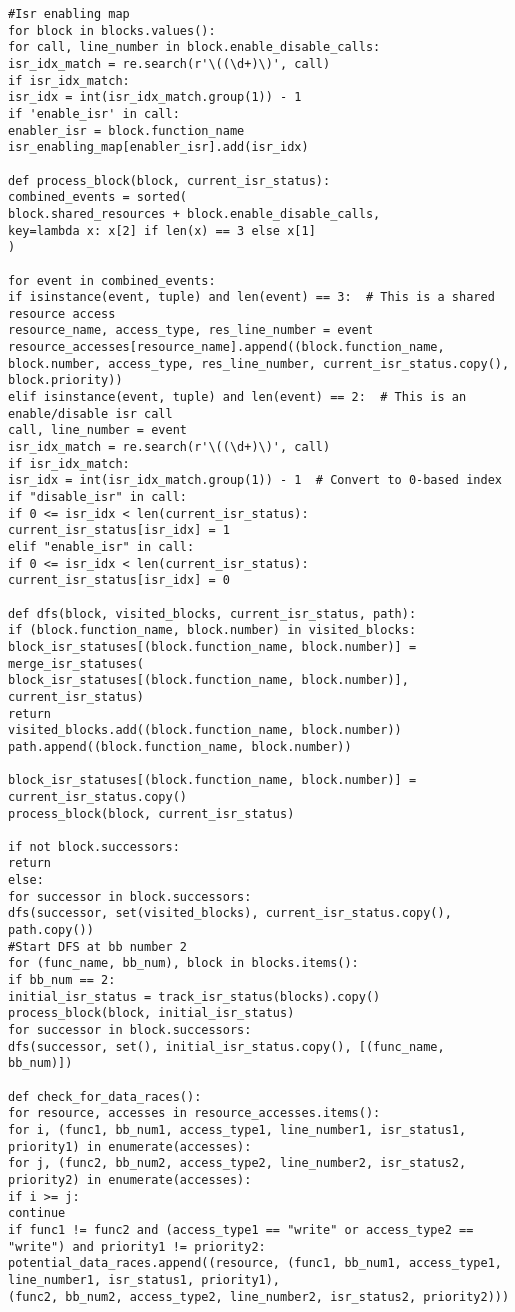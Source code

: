 \documentclass[
fancyheadings, %
%
%
]{stsreprt}
\begin{document}
{\begin{lstlisting}
#Isr enabling map
for block in blocks.values():
for call, line_number in block.enable_disable_calls:
isr_idx_match = re.search(r'\((\d+)\)', call)
if isr_idx_match:
isr_idx = int(isr_idx_match.group(1)) - 1
if 'enable_isr' in call:
enabler_isr = block.function_name
isr_enabling_map[enabler_isr].add(isr_idx)

def process_block(block, current_isr_status):
combined_events = sorted(
block.shared_resources + block.enable_disable_calls,
key=lambda x: x[2] if len(x) == 3 else x[1]
)

for event in combined_events:
if isinstance(event, tuple) and len(event) == 3:  # This is a shared resource access
resource_name, access_type, res_line_number = event
resource_accesses[resource_name].append((block.function_name, block.number, access_type, res_line_number, current_isr_status.copy(), block.priority))
elif isinstance(event, tuple) and len(event) == 2:  # This is an enable/disable isr call
call, line_number = event
isr_idx_match = re.search(r'\((\d+)\)', call)
if isr_idx_match:
isr_idx = int(isr_idx_match.group(1)) - 1  # Convert to 0-based index
if "disable_isr" in call:
if 0 <= isr_idx < len(current_isr_status):
current_isr_status[isr_idx] = 1
elif "enable_isr" in call:
if 0 <= isr_idx < len(current_isr_status):
current_isr_status[isr_idx] = 0

def dfs(block, visited_blocks, current_isr_status, path):
if (block.function_name, block.number) in visited_blocks:
block_isr_statuses[(block.function_name, block.number)] = merge_isr_statuses(
block_isr_statuses[(block.function_name, block.number)], current_isr_status)
return
visited_blocks.add((block.function_name, block.number))
path.append((block.function_name, block.number))

block_isr_statuses[(block.function_name, block.number)] = current_isr_status.copy()
process_block(block, current_isr_status)

if not block.successors:
return
else:
for successor in block.successors:
dfs(successor, set(visited_blocks), current_isr_status.copy(), path.copy())
#Start DFS at bb number 2
for (func_name, bb_num), block in blocks.items():
if bb_num == 2:  
initial_isr_status = track_isr_status(blocks).copy()
process_block(block, initial_isr_status)
for successor in block.successors:
dfs(successor, set(), initial_isr_status.copy(), [(func_name, bb_num)])

def check_for_data_races():
for resource, accesses in resource_accesses.items():
for i, (func1, bb_num1, access_type1, line_number1, isr_status1, priority1) in enumerate(accesses):
for j, (func2, bb_num2, access_type2, line_number2, isr_status2, priority2) in enumerate(accesses):
if i >= j:
continue  
if func1 != func2 and (access_type1 == "write" or access_type2 == "write") and priority1 != priority2:
potential_data_races.append((resource, (func1, bb_num1, access_type1, line_number1, isr_status1, priority1),
(func2, bb_num2, access_type2, line_number2, isr_status2, priority2)))


\end{lstlisting}}
\end{document}

